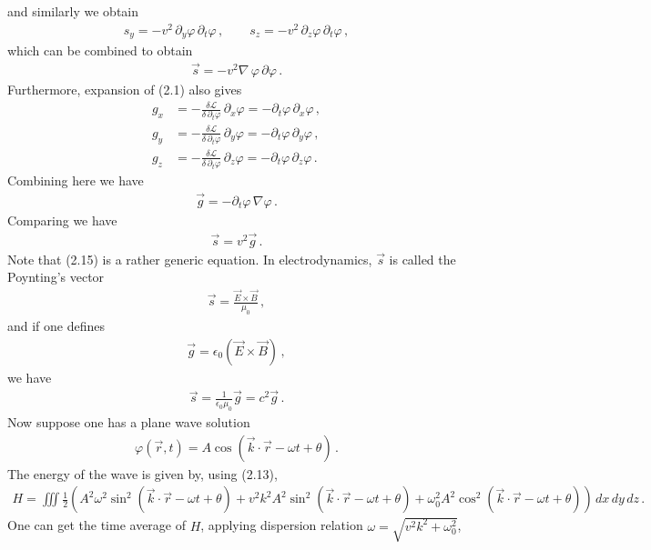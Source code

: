 \documentclass[11pt, onesided]{book}
\theoremstyle{break}
\theoremstyle{break}
\newcommand{\pd}{\partial}
\begin{document}
and similarly we obtain
\begin{align*}
s_y = -v^2\, \pd_y \varphi \, \pd_t \varphi \,,\qquad s_z = -v^2 \, \pd_z \varphi \, \pd_t \varphi\,,
\end{align*}
which can be combined to obtain
\begin{align*}
\vec{s} = -v^2 \nabla\, \varphi \, \pd\varphi\,.
\end{align*}
Furthermore, expansion of (2.1) also gives
\begin{align*}
g_x &= -\frac{\delta \mathcal{L}}{\delta\, \pd_t \varphi}\, \pd_x \varphi = -\pd_t \varphi \, \pd_x \varphi\,,\\
g_y &= -\frac{\delta \mathcal{L}}{\delta\, \pd_t \varphi}\, \pd_y \varphi = -\pd_t \varphi \, \pd_y \varphi\,,\\
g_z &= -\frac{\delta \mathcal{L}}{\delta\, \pd_t \varphi}\, \pd_z \varphi = -\pd_t \varphi \, \pd_z \varphi\,.
\end{align*}
Combining here we have
\begin{align*}
\vec{g} = -\pd_t \varphi \, \nabla \varphi\,.
\end{align*}
Comparing we have
\begin{align}
\vec{s} = v^2 \vec{g}\,.
\end{align}
Note that (2.15) is a rather generic equation. In electrodynamics, $\vec{s}$ is called the Poynting's vector
\begin{align*}
\vec{s} = \frac{\vec{E} \times \vec{B}}{\mu_0}\,,
\end{align*}
and if one defines
\begin{align*}
\vec{g} = \epsilon_0 (\vec{E}\times \vec{B})\,,
\end{align*}
we have
\begin{align*}
\vec{s} = \frac{1}{\epsilon_0 \mu_0}\vec{g} = c^2 \vec{g}\,.
\end{align*}
Now suppose one has a plane wave solution
\begin{align*}
\varphi(\vec{r},t) = A\cos(\vec{k}\cdot \vec{r}- \omega t + \theta)\,.
\end{align*}
The energy of the wave is given by, using (2.13),
\begin{align*}
H = \iiint \frac{1}{2}\left(A^2 \omega^2 \sin^2(\vec{k}\cdot \vec{r} - \omega t + \theta) + v^2 k^2 A^2 \sin^2(\vec{k}\cdot \vec{r} - \omega t + \theta)+\omega_0^2 A^2 \cos^2(\vec{k}\cdot \vec{r} - \omega t+ \theta) \right)  \, dx\, dy\, dz\,.
\end{align*}
One can get the time average of $H$, applying dispersion relation $\omega = \sqrt{v^2 k^2 + \omega_0^2}$,
\end{document}
